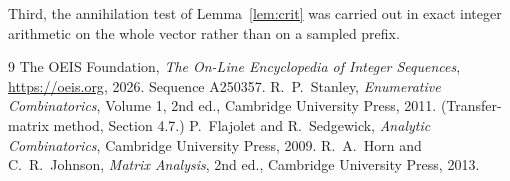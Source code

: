 \documentclass[11pt,a4paper]{article}
\theoremstyle{plain}
\theoremstyle{definition}
\begin{document}
Third, the annihilation test of Lemma~\ref{lem:crit} was carried out in exact integer
arithmetic on the whole vector rather than on a sampled prefix.

\begin{thebibliography}{9}
 The OEIS Foundation, \emph{The On-Line Encyclopedia of Integer
Sequences}, \url{https://oeis.org}, 2026. Sequence A250357.
 R.~P.~Stanley, \emph{Enumerative Combinatorics}, Volume 1, 2nd ed.,
Cambridge University Press, 2011. (Transfer-matrix method, Section 4.7.)
 P.~Flajolet and R.~Sedgewick, \emph{Analytic Combinatorics}, Cambridge
University Press, 2009.
 R.~A.~Horn and C.~R.~Johnson, \emph{Matrix Analysis}, 2nd ed., Cambridge
University Press, 2013.
\end{thebibliography}
\end{document}
